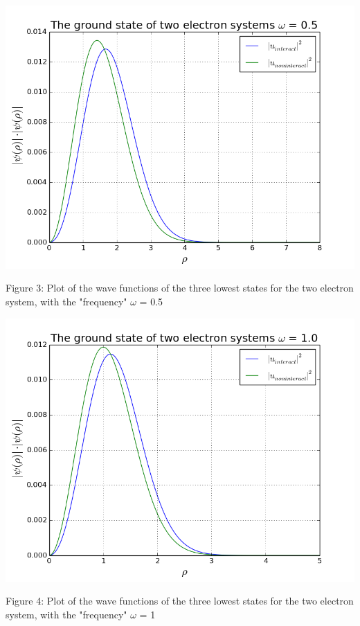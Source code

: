 \documentclass[norsk,a4paper,12pt]{article}
\begin{document}
\includegraphics[scale=0.55]{wavefunc_two_omega=0_5}\par
\vspace{1mm}
Figure 3: Plot of the wave functions of the three lowest states for the two electron  system, with the "frequency" $\omega$ = 0.5
\par
\vspace{7mm}

\includegraphics[scale=0.65]{wavefunc_two_omega=1}\par
\vspace{1mm}
Figure 4: Plot of the wave functions of the three lowest states for the two electron  system, with the "frequency" $\omega$ = 1
\par
\vspace{7mm}
\end{document}
